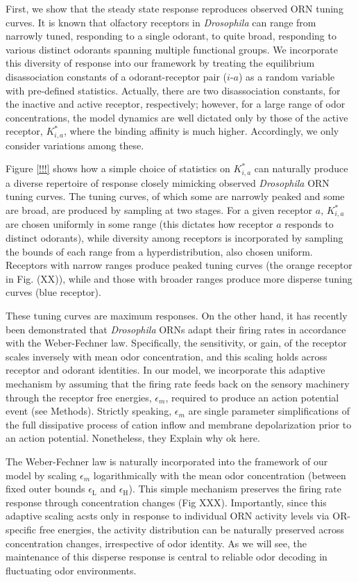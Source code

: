 First, we show that the steady state response reproduces observed ORN tuning curves. It is known that olfactory receptors in \textit{Drosophila} can range from narrowly tuned, responding to a single odorant, to quite broad, responding to various distinct odorants spanning multiple functional groups. We incorporate this diversity of response into our framework by treating the equilibrium disassociation constants of a odorant-receptor pair ($i$-$a$) as a random variable with pre-defined statistics. Actually, there are two disassociation constants, for the inactive and active receptor, respectively; however, for a large range of odor concentrations, the model dynamics are well dictated only by those of the active receptor, $K^*_{i, a}$, where the binding affinity is much higher. Accordingly, we only consider variations among these. 

Figure \ref{!!!} shows how a simple choice of statistics on $K^*_{i, a}$ can naturally produce a diverse repertoire of response closely mimicking observed \textit{Drosophila} ORN tuning curves. The tuning curves, of which some are narrowly peaked and some are broad, are produced by sampling at two stages. For a given receptor $a$, $K^*_{i,a}$ are chosen uniformly in some range (this dictates how receptor $a$ responds to distinct odorants), while diversity among receptors is incorporated by sampling the bounds of each range from a hyperdistribution, also chosen uniform. Receptors with narrow ranges produce peaked tuning curves (the orange receptor in Fig. (XX)), while and those with broader ranges produce more disperse tuning curves (blue receptor). 


These tuning curves are maximum responses. On the other hand, it has recently been demonstrated that \textit{Drosophila} ORNs adapt their firing rates in accordance with the Weber-Fechner law. Specifically, the sensitivity, or gain, of the receptor scales inversely with mean odor concentration, and this scaling holds across receptor and odorant identities. In our model, we incorporate this adaptive mechanism by assuming that the firing rate feeds back on the sensory machinery through the receptor free energies, $\epsilon_m$, required to produce an action potential event (see Methods). Strictly speaking, $\epsilon_m$ are single parameter simplifications of the full dissipative process of cation inflow and membrane depolarization prior to an action potential. Nonetheless, they {\color{blue} Explain why ok here}.  

The Weber-Fechner law is naturally incorporated into the framework of our model by scaling $\epsilon_m$ logarithmically with the mean odor concentration (between fixed outer bounds $\epsilon_{\text {L}}$ and $\epsilon_{\text {H}}$). This simple mechanism preserves the firing rate response through concentration changes (Fig XXX). Importantly, since this adaptive scaling acsts only in response to individual ORN activity levels via OR-specific free energies, the activity distribution can be naturally preserved across concentration changes, irrespective of odor identity. As we will see, the maintenance of this disperse response is central to reliable odor decoding in fluctuating odor environments. 


